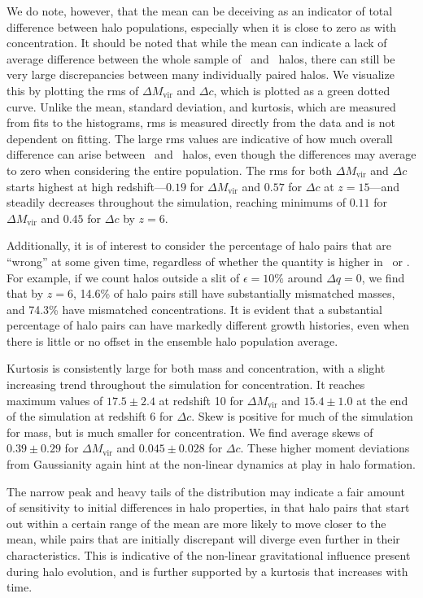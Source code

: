 We do note, however, that the mean can be deceiving as an indicator of total difference between halo populations, especially when it is close to zero as with concentration.  It should be noted that while the mean can indicate a lack of average difference between the whole sample of \lpt\ and \za\ halos, there can still be very large discrepancies between many individually paired halos.  We visualize this by plotting the rms of $\Delta M_{\mathrm{vir}}$ and $\Delta c$, which is plotted as a green dotted curve.  Unlike the mean, standard deviation, and kurtosis, which are measured from fits to the histograms, rms is measured directly from the data and is not dependent on fitting.  The large rms values are indicative of how much overall difference can arise between \lpt\ and \za\ halos, even though the differences may average to zero when considering the entire population.  The rms for both $\Delta M_{\mathrm{vir}}$ and $\Delta c$ starts highest at high redshift---$0.19$ for $\Delta M_{\mathrm{vir}}$ and $0.57$ for $\Delta c$ at $z = 15$---and steadily decreases throughout the simulation, reaching minimums of $0.11$ for $\Delta M_{\mathrm{vir}}$ and $0.45$ for $\Delta c$ by $z = 6$.

Additionally, it is of interest to consider the percentage of halo pairs that are ``wrong'' at some given time, regardless of whether the quantity is higher in \lpt\ or \za.  For example, if we count halos outside a slit of $\epsilon = 10\%$ around $\Delta q = 0$, we find that by $z = 6$, 14.6\% of halo pairs still have substantially mismatched masses, and 74.3\% have mismatched concentrations.  It is evident that a substantial percentage of halo pairs can have markedly different growth histories, even when there is little or no offset in the ensemble halo population average.

Kurtosis is consistently large for both mass and concentration, with a slight increasing trend throughout the simulation for concentration.  It reaches maximum values of $17.5 \pm 2.4$ at redshift 10 for $\Delta M_{\mathrm{vir}}$ and $15.4 \pm 1.0$ at the end of the simulation at redshift 6 for $\Delta c$.  Skew is positive for much of the simulation for mass, but is much smaller for concentration.  We find average skews of $0.39 \pm 0.29$ for $\Delta M_{\mathrm{vir}}$ and $0.045 \pm 0.028$ for $\Delta c$.  These higher moment deviations from Gaussianity again hint at the non-linear dynamics at play in halo formation.

The narrow peak and heavy tails of the distribution may indicate a fair amount of sensitivity to initial differences in halo properties, in that halo pairs that start out within a certain range of the mean are more likely to move closer to the mean, while pairs that are initially discrepant will diverge even further in their characteristics.  This is indicative of the non-linear gravitational influence present during halo evolution, and is further supported by a kurtosis that increases with time.

